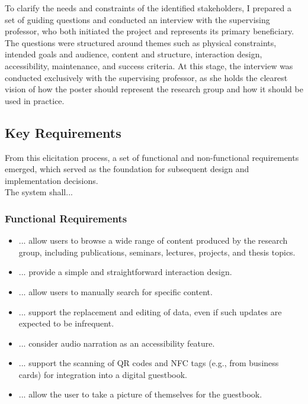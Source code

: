 To clarify the needs and constraints of the identified stakeholders, I prepared a set of guiding questions and conducted an interview with the supervising professor, who both initiated the project and represents its primary beneficiary. The questions were structured around themes such as physical constraints, intended goals and audience, content and structure, interaction design, accessibility, maintenance, and success criteria. At this stage, the interview was conducted exclusively with the supervising professor, as she holds the clearest vision of how the poster should represent the research group and how it should be used in practice.

\subsection{Key Requirements}

From this elicitation process, a set of functional and non-functional requirements emerged, which served as the foundation for subsequent design and implementation decisions.\\

The system shall...
\subsubsection{Functional Requirements}
\begin{itemize}
	\item ... allow users to browse a wide range of content produced by the research group, including publications, seminars, lectures, projects, and thesis topics. 
	\item ... provide a simple and straightforward interaction design. 
	\item ... allow users to manually search for specific content. 
	\item ... support the replacement and editing of data, even if such updates are expected to be infrequent. 
	\item ... consider audio narration as an accessibility feature. 
	\item ... support the scanning of QR codes and NFC tags (e.g., from business cards) for integration into a digital guestbook. 
	\item ... allow the user to take a picture of themselves for the guestbook.
\end{itemize}

